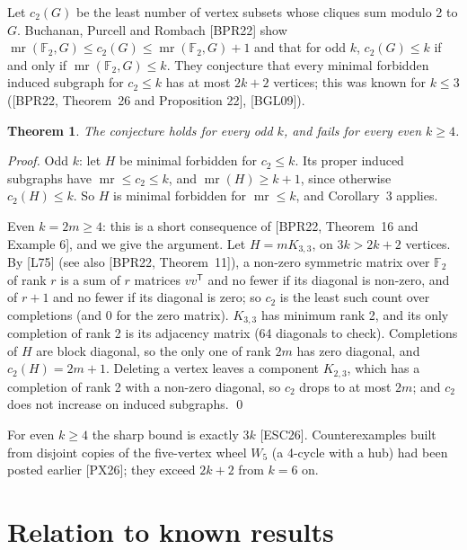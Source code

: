 \documentclass[11pt,letterpaper,reqno]{amsart}
\theoremstyle{spaced}
\newtheorem{theorem}{Theorem}
\begin{document}
Let \(c_2(G)\) be the least number of vertex subsets whose cliques sum modulo 2 to \(G\). Buchanan, Purcell and Rombach {[}BPR22{]} show \(\operatorname{mr}(\mathbb{F}_2, G) \le c_2(G) \le \operatorname{mr}(\mathbb{F}_2, G) + 1\) and that for odd \(k\), \(c_2(G) \le k\) if and only if \(\operatorname{mr}(\mathbb{F}_2, G) \le k\). They conjecture that every minimal forbidden induced subgraph for \(c_2 \le k\) has at most \(2k+2\) vertices; this was known for \(k \le 3\) ({[}BPR22, Theorem~26 and Proposition 22{]}, {[}BGL09{]}).

\begin{theorem}
The conjecture holds for every odd \(k\), and fails for every even \(k \ge 4\).
\end{theorem}

\emph{Proof.} Odd \(k\): let \(H\) be minimal forbidden for \(c_2 \le k\). Its proper induced subgraphs have \(\operatorname{mr} \le c_2 \le k\), and \(\operatorname{mr}(H) \ge k+1\), since otherwise \(c_2(H) \le k\). So \(H\) is minimal forbidden for \(\operatorname{mr} \le k\), and Corollary~3 applies.

Even \(k = 2m \ge 4\): this is a short consequence of {[}BPR22, Theorem~16 and Example 6{]}, and we give the argument. Let \(H = mK_{3,3}\), on \(3k > 2k+2\) vertices. By {[}L75{]} (see also {[}BPR22, Theorem~11{]}), a non-zero symmetric matrix over \(\mathbb{F}_2\) of rank \(r\) is a sum of \(r\) matrices \(vv^{\mathsf T}\) and no fewer if its diagonal is non-zero, and of \(r+1\) and no fewer if its diagonal is zero; so \(c_2\) is the least such count over completions (and \(0\) for the zero matrix). \(K_{3,3}\) has minimum rank 2, and its only completion of rank 2 is its adjacency matrix (64 diagonals to check). Completions of \(H\) are block diagonal, so the only one of rank \(2m\) has zero diagonal, and \(c_2(H) = 2m+1\). Deleting a vertex leaves a component \(K_{2,3}\), which has a completion of rank 2 with a non-zero diagonal, so \(c_2\) drops to at most \(2m\); and \(c_2\) does not increase on induced subgraphs. \qed

For even \(k \ge 4\) the sharp bound is exactly \(3k\) {[}ESC26{]}. Counterexamples built from disjoint copies of the five-vertex wheel \(W_5\) (a 4-cycle with a hub) had been posted earlier {[}PX26{]}; they exceed \(2k+2\) from \(k = 6\) on.

\hypertarget{relation-to-known-results}{%
\section{Relation to known results}\label{relation-to-known-results}}
\end{document}
